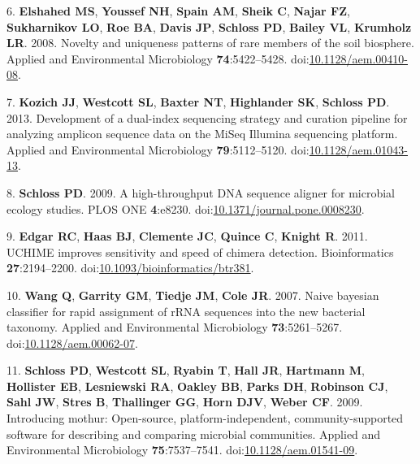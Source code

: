 \documentclass[11pt,]{article}
\begin{document}
\hypertarget{ref-Elshahed2008}{}
6. \textbf{Elshahed MS}, \textbf{Youssef NH}, \textbf{Spain AM},
\textbf{Sheik C}, \textbf{Najar FZ}, \textbf{Sukharnikov LO},
\textbf{Roe BA}, \textbf{Davis JP}, \textbf{Schloss PD}, \textbf{Bailey
VL}, \textbf{Krumholz LR}. 2008. Novelty and uniqueness patterns of rare
members of the soil biosphere. Applied and Environmental Microbiology
\textbf{74}:5422--5428.
doi:\href{https://doi.org/10.1128/aem.00410-08}{10.1128/aem.00410-08}.

\hypertarget{ref-Kozich2013}{}
7. \textbf{Kozich JJ}, \textbf{Westcott SL}, \textbf{Baxter NT},
\textbf{Highlander SK}, \textbf{Schloss PD}. 2013. Development of a
dual-index sequencing strategy and curation pipeline for analyzing
amplicon sequence data on the MiSeq Illumina sequencing platform.
Applied and Environmental Microbiology \textbf{79}:5112--5120.
doi:\href{https://doi.org/10.1128/aem.01043-13}{10.1128/aem.01043-13}.

\hypertarget{ref-Schloss2009a}{}
8. \textbf{Schloss PD}. 2009. A high-throughput DNA sequence aligner for
microbial ecology studies. PLOS ONE \textbf{4}:e8230.
doi:\href{https://doi.org/10.1371/journal.pone.0008230}{10.1371/journal.pone.0008230}.

\hypertarget{ref-Edgar2011}{}
9. \textbf{Edgar RC}, \textbf{Haas BJ}, \textbf{Clemente JC},
\textbf{Quince C}, \textbf{Knight R}. 2011. UCHIME improves sensitivity
and speed of chimera detection. Bioinformatics \textbf{27}:2194--2200.
doi:\href{https://doi.org/10.1093/bioinformatics/btr381}{10.1093/bioinformatics/btr381}.

\hypertarget{ref-Wang2007}{}
10. \textbf{Wang Q}, \textbf{Garrity GM}, \textbf{Tiedje JM},
\textbf{Cole JR}. 2007. Naive bayesian classifier for rapid assignment
of rRNA sequences into the new bacterial taxonomy. Applied and
Environmental Microbiology \textbf{73}:5261--5267.
doi:\href{https://doi.org/10.1128/aem.00062-07}{10.1128/aem.00062-07}.

\hypertarget{ref-Schloss2009b}{}
11. \textbf{Schloss PD}, \textbf{Westcott SL}, \textbf{Ryabin T},
\textbf{Hall JR}, \textbf{Hartmann M}, \textbf{Hollister EB},
\textbf{Lesniewski RA}, \textbf{Oakley BB}, \textbf{Parks DH},
\textbf{Robinson CJ}, \textbf{Sahl JW}, \textbf{Stres B},
\textbf{Thallinger GG}, \textbf{Horn DJV}, \textbf{Weber CF}. 2009.
Introducing mothur: Open-source, platform-independent,
community-supported software for describing and comparing microbial
communities. Applied and Environmental Microbiology
\textbf{75}:7537--7541.
doi:\href{https://doi.org/10.1128/aem.01541-09}{10.1128/aem.01541-09}.
\end{document}
